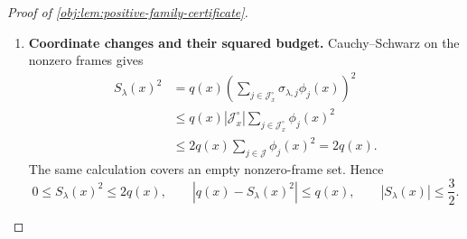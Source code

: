 \documentclass[11pt]{article}
\begin{document}
\begin{proof}[Proof of \cref{obj:lem:positive-family-certificate}]
\begin{enumerate}
For two sign vectors, define the overlap integrand and its integral by
\[
\begin{aligned}
\mathcal H_{\lambda,\lambda'}(x)
={}&t\bigl(1+(tq(x)-1)^2\bigr)S_\lambda(x)S_{\lambda'}(x)\\
&+t^2\bigl(q(x)-S_\lambda(x)^2\bigr)
       \bigl(q(x)-S_{\lambda'}(x)^2\bigr),
\qquad x\in[0,1],\\
H_{\lambda,\lambda'}&=\int_0^1
                         \mathcal H_{\lambda,\lambda'}(x)\,dx.
\end{aligned}
\]
Expanding the four fair mark cells cancels every product of distinct
members of \(1,U,V_Y,UV_Y\), and gives
\begin{equation}
\label{eq:positive-family-fair-mark-identity}
\frac14\sum_{U\in\{-1,1\}}\sum_{V_Y\in\{-1,1\}}
 L_\lambda(x,U,V_Y)L_{\lambda'}(x,U,V_Y)
=1+\mathcal H_{\lambda,\lambda'}(x).
\end{equation}
Each summand lies in \([0,16]\), so
\[
-1\le\mathcal H_{\lambda,\lambda'}(x)\le15,
\qquad
-1\le H_{\lambda,\lambda'}\le15,
\qquad
|H_{\lambda,\lambda'}|\le15.
\]
All the displayed functions are measurable and bounded.

For fixed \(\lambda'\), the sign moments established above imply
\[
\begin{aligned}
E_\lambda\mathcal H_{\lambda,\lambda'}(x)
={}&t\bigl(1+(tq(x)-1)^2\bigr)
       S_{\lambda'}(x)E_\lambda S_\lambda(x)\\
&+t^2\bigl(q(x)-E_\lambda S_\lambda(x)^2\bigr)
       \bigl(q(x)-S_{\lambda'}(x)^2\bigr)
=0.
\end{aligned}
\]
Commuting the finite sign average with the integral gives
\[
E_\lambda H_{\lambda,\lambda'}=0.
\]

\item \textbf{Coordinate changes and their squared budget.}
Cauchy--Schwarz on the nonzero frames gives
\[
\begin{aligned}
S_\lambda(x)^2
&=q(x)\left(
  \sum_{j\in\mathcal J_x^\circ}\sigma_{\lambda,j}\phi_j(x)
       \right)^2\\
&\le q(x)|\mathcal J_x^\circ|
               \sum_{j\in\mathcal J_x^\circ}\phi_j(x)^2\\
&\le2q(x)\sum_{j\in\mathcal J}\phi_j(x)^2
=2q(x).
\end{aligned}
\]
The same calculation covers an empty nonzero-frame set. Hence
\[
0\le S_\lambda(x)^2\le2q(x),
\qquad
|q(x)-S_\lambda(x)^2|\le q(x),
\qquad
|S_\lambda(x)|\le\frac32.
\]


\end{enumerate}
\end{proof}
\end{document}
